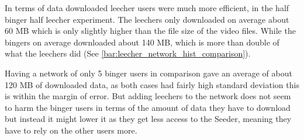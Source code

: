 In terms of data downloaded leecher users were much more efficient, in the half binger half leecher experiment. The leechers only downloaded on average about 60 \ac{MB} which is only slightly higher than the file size of the video files. While the bingers on average downloaded about 140 \ac{MB}, which is more than double of what the leechers did (See \autoref{bar:leecher_network_hist_comparison}). 


Having a network of only 5 binger users in comparison gave an average of about 120 \ac{MB} of downloaded data, as both cases had fairly high standard deviation this is within the margin of error. But adding leechers to the network does not seem to harm the binger users in terms of the amount of data they have to download but instead it might lower it as they get less access to the Seeder, meaning they have to rely on the other users more.

